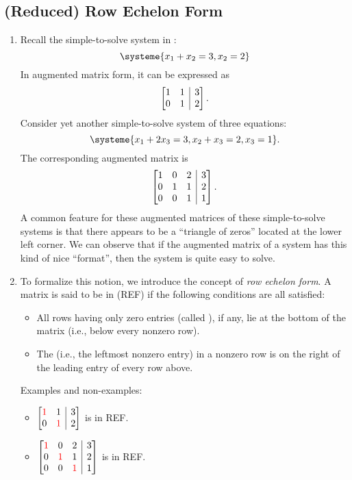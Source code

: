 \subsection{(Reduced) Row Echelon Form}
\begin{enumerate}
\item Recall the simple-to-solve system in :
\[
\systeme{
x_1+x_2=3,
x_2=2
}
\]
In augmented matrix form, it can be expressed as
\[
\left[\begin{array}{@{}cc|c@{}}
1&1&3\\
0&1&2
\end{array}\right].
\]
Consider yet another simple-to-solve system of three equations:
\[
\systeme{
x_1+2x_3=3,
x_2+x_3=2,
x_3=1
}.
\]
The corresponding augmented matrix is
\[
\left[\begin{array}{@{}ccc|c@{}}
1&0&2&3\\
0&1&1&2\\
0&0&1&1\\
\end{array}\right].
\]
A common feature for these augmented matrices of these simple-to-solve systems
is that there appears to be a ``triangle of zeros'' located at the lower left
corner. We can observe that if the augmented matrix of a system has this kind
of nice ``format'', then the system is quite easy to solve.

\item To formalize this notion, we introduce the concept of \emph{row echelon
form}. A matrix is said to be in  (REF) if the
following conditions are all satisfied:
\begin{itemize}
\item All rows having only zero entries (called ), if any, lie
at the bottom of the matrix (i.e., below every nonzero row).
\item The  (i.e., the leftmost nonzero entry) in a
nonzero row is on the right of the leading entry of every row above.
\end{itemize}
Examples and non-examples:
\begin{itemize}
\item \(
\left[\begin{array}{@{}cc|c@{}}
\rc{1}&1&3\\
0&\rc{1}&2
\end{array}\right]
\) is in REF.
\item \(
\left[\begin{array}{@{}ccc|c@{}}
\rc{1}&0&2&3\\
0&\rc{1}&1&2\\
0&0&\rc{1}&1\\
\end{array}\right]
\) is in REF.


\end{itemize}
\end{enumerate}
